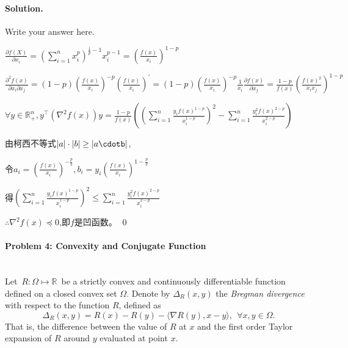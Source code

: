 \documentclass[a4paper]{article}
\newenvironment{solution}
{\color{blue} \paragraph{Solution.}}
{\newline \qed}
\begin{document}
\begin{solution}
Write your answer here.

$\frac{\partial f(X)}{\partial x_i}=(\sum^n_{i=1} x^p_i)^{\frac{1}{p}-1}x_i^{p-1}=(\frac{f(x)}{x_i})^{1-p}$

$\frac{\partial ^2 f(x)}{\partial x_i \partial x_j}
= (1-p)(\frac{f(x)}{x_i})^{-p}(\frac{f(x)}{x_i})^{'}
= (1-p)(\frac{f(x)}{x_i})^{-p}\frac{1}{x_i}\frac{\partial f(x)}{\partial x_j}
= \frac{1-p}{f(x)}(\frac{f(x)^2}{x_ix_j})^{1-p}$

$\forall y \in \mathbb{R}^n_{+}, y^{\top}(\nabla ^2 f(x))y
= \frac{1-p}{f(x)}((\sum^n_{i=1} \frac{y_i f(x)^{1-p}}{x_i^{1-p}})^2-\sum^n_{i=1} \frac{y_i^2 f(x)^{2-p}}{x_i^{2-p}})$

由柯西不等式$|a|\cdot |b| \geq |a\cdotb|$,

令$a_i=(\frac{f(x)}{x_i})^{-\frac{p}{2}}, b_i=y_i(\frac{f(x)}{x_i})^{1-\frac{p}{2}}$

得$(\sum^n_{i=1} \frac{y_i f(x)^{1-p}}{x_i^{1-p}})^2 \leq \sum^n_{i=1} \frac{y_i^2 f(x)^{2-p}}{x_i^{2-p}}$

$\therefore \nabla ^2 f(x) \preceq 0$,即$f$是凹函数。
\end{solution}


\paragraph{Problem 4: Convexity and Conjugate Function}
~\\

\noindent
Let~$R:\Omega \mapsto \mathbb{R}$~be a strictly convex and continuously differentiable function defined on a closed convex set $\Omega$. Denote by $\Delta_{R} (x, y)$ the \textit{Bregman divergence} with respect to the function $R$, defined as
\begin{equation}\label{bregman divergence}
\Delta_{R} (x, y) = R(x) - R(y) - \langle \nabla R(y), x - y \rangle, ~~\forall x, y \in \Omega.
\end{equation}
That is, the difference between the value of $R$ at $x$ and the first order Taylor expansion of $R$ around $y$ evaluated at point $x$.
\end{document}
